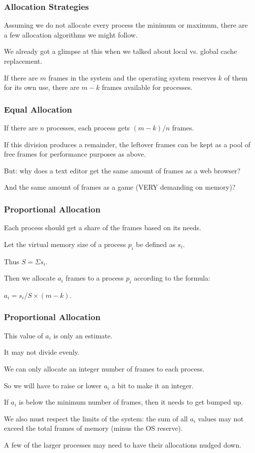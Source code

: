 \begin{frame}
\frametitle{Allocation Strategies}

Assuming we do not allocate every process the minimum or maximum, there are a few allocation algorithms we might follow. 

We already got a glimpse at this when we talked about local vs. global cache replacement.

If there are $m$ frames in the system and the operating system reserves $k$ of them for its own use, there are $m-k$ frames available for processes.

\end{frame}

\begin{frame}
\frametitle{Equal Allocation}

If there are $n$ processes, each process gets $(m-k)/n$ frames. 

If this division produces a remainder, the leftover frames can be kept as a pool of free frames for performance purposes as above. 

But: why does a text editor get the same amount of frames as a web browser?

And the same amount of frames as a game (VERY demanding on memory)?


\end{frame}

\begin{frame}
\frametitle{Proportional Allocation}

Each process should get a share of the frames based on its needs. 

Let the virtual memory size of a process $p_{i}$ be defined as $s_{i}$. 

Thus $S = \Sigma s_{i}$. 

Then we allocate $a_{i}$ frames to a process $p_{i}$ according to the formula: 

$a_{i} = s_{i} / S \times (m - k)$.

\end{frame}

\begin{frame}
\frametitle{Proportional Allocation}

This value of $a_{i}$ is only an estimate. 

It may not divide evenly. 

We can only allocate an integer number of frames to each process.  

So we will have to raise or lower $a_{i}$ a bit to make it an integer. 

If $a_{i}$ is below the minimum number of frames, then it needs to get bumped up.

We also must respect the limits of the system: the sum of all $a_{i}$ values may not exceed the total frames of memory (minus the OS reserve).

A few of the larger processes may need to have their allocations nudged down.


\end{frame}

